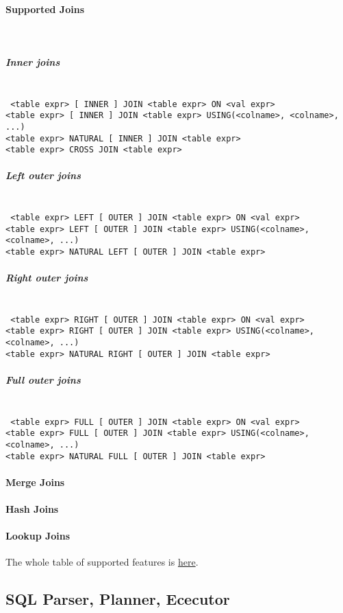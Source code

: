 \documentclass[12pt,a4paper]{article}
\newcommand{\code}[1]{\texttt{#1}}
\newcommand{\myparagraph}[1]{\paragraph{#1}\mbox{}\\}
\newcommand{\mysubparagraph}[1]{\subparagraph{#1}\mbox{}\\}
\begin{document}
\myparagraph{Supported Joins}
\mysubparagraph{Inner joins}
\code{
	<table expr> [ INNER ] JOIN <table expr> ON <val expr>\\
	<table expr> [ INNER ] JOIN <table expr> USING(<colname>, <colname>, ...)\\
	<table expr> NATURAL [ INNER ] JOIN <table expr>\\
	<table expr> CROSS JOIN <table expr>
}

\mysubparagraph{Left outer joins}
\code{
	<table expr> LEFT [ OUTER ] JOIN <table expr> ON <val expr>\\
	<table expr> LEFT [ OUTER ] JOIN <table expr> USING(<colname>, <colname>, ...)\\
	<table expr> NATURAL LEFT [ OUTER ] JOIN <table expr>
}

\mysubparagraph{Right outer joins}
\code{
	<table expr> RIGHT [ OUTER ] JOIN <table expr> ON <val expr>\\
	<table expr> RIGHT [ OUTER ] JOIN <table expr> USING(<colname>, <colname>, ...)\\
	<table expr> NATURAL RIGHT [ OUTER ] JOIN <table expr>
}

\mysubparagraph{Full outer joins}
\code{
	<table expr> FULL [ OUTER ] JOIN <table expr> ON <val expr>\\
	<table expr> FULL [ OUTER ] JOIN <table expr> USING(<colname>, <colname>, ...)\\
	<table expr> NATURAL FULL [ OUTER ] JOIN <table expr>
}

\paragraph{Merge Joins}

\paragraph{Hash Joins}

\paragraph{Lookup Joins}



The whole table of supported features is \href{https://www.cockroachlabs.com/docs/stable/sql-feature-support.html}{here}.

\subsection{SQL Parser, Planner, Ececutor}
\end{document}
